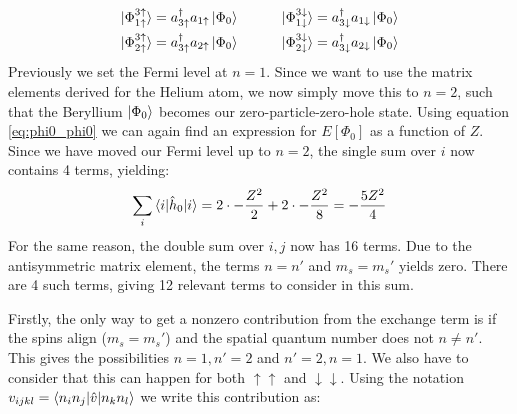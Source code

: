 \documentclass{article}
\newcommand{\gs}{\ket{\Phi_0}}
\newcommand{\exed}[2]{\ket{\Phi_{#1}^{#2}}}
\newcommand{\ups}[1]{#1\uparrow}
\newcommand{\downs}[1]{#1\downarrow}
\newcommand{\inner}[3]{\braket{#1|#2|#3}}
\newcommand{\hnull}{\hat{h}_0}
\newcommand{\crt}[1]{a_{#1}^{\dagger}}
\newcommand{\ani}[1]{a_{#1}}
\begin{document}
    \begin{align*}
        \exed{\ups{1}}{\ups{3}} = \crt{\ups{3}}\ani{\ups{1}}\gs\hspace{30px}&\exed{\downs{1}}{\downs{3}} = \crt{\downs{3}}\ani{\downs{1}}\gs \\
        \exed{\ups{2}}{\ups{3}} = \crt{\ups{3}}\ani{\ups{2}}\gs\hspace{30px}&\exed{\downs{2}}{\downs{3}} = \crt{\downs{3}}\ani{\downs{2}}\gs
    \end{align*}
    Previously we set the Fermi level at $n = 1$. Since we want to use the matrix elements derived for the Helium atom, we now simply move this to $n = 2$, such that the Beryllium $\gs$ becomes our zero-particle-zero-hole state. Using equation \eqref{eq:phi0_phi0} we can again find an expression for $E[\Phi_0]$ as a function of $Z$. Since we have moved our Fermi level up to $n = 2$, the single sum over $i$ now contains 4 terms, yielding:
    \begin{align*}
        \sum_{i} \inner{i}{\hnull}{i} = 2 \cdot - \frac{Z^2}{2} + 2 \cdot - \frac{Z^2}{8} = -\frac{5Z^2}{4}
    \end{align*}
    For the same reason, the double sum over $i,j$ now has 16 terms. Due to the antisymmetric matrix element, the terms $n = n'$ and $m_s = m_s'$ yields zero. There are 4 such terms, giving 12 relevant terms to consider in this sum. 
    
    Firstly, the only way to get a nonzero contribution from the exchange term is if the spins align ($m_s = m_s'$) and the spatial quantum number does not $n \neq n'$. This gives the possibilities $n = 1, n'=2$ and $n' = 2, n=1$. We also have to consider that this can happen for both $\uparrow \uparrow$ and $\downarrow\downarrow$. Using the notation $v_{ijkl} = \inner{n_i n_j}{\hat{v}}{n_k n_l}$ we write this contribution as:
    
\end{document}
